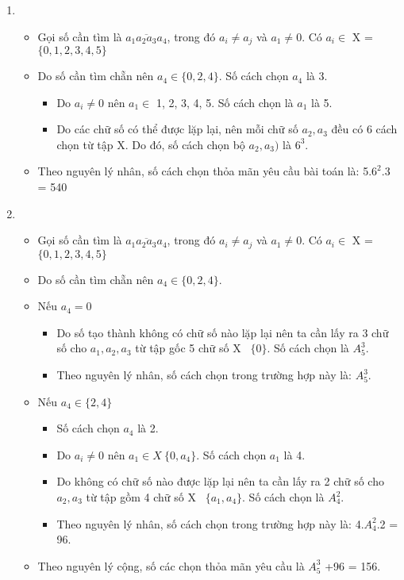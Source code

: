 \documentclass[12pt,oneside]{book}
\begin{document}
\begin{enumerate}[label = \alph*)]
\begin{itemize}
\end{itemize}
\item 
\begin{itemize}
	\item Gọi số cần tìm là $\overline{a_1a_2a_3a_4}$, trong đó $a_i \ne a_j$ và $a_1 \ne 0$. Có  $a_i \in$ X = $\{0, 1, 2, 3, 4, 5\}$
	\item Do số cần tìm chẵn nên $a_4\in \{0,2,4\}$. Số cách chọn $a_4$ là 3.
	\begin{itemize}
		\item Do $a_i \ne 0$ nên $a_1 \in $ {1, 2, 3, 4, 5}. Số cách chọn là $a_1$ là 5.
		\item Do các chữ số có thể được lặp lại, nên mỗi chữ số $a_2,a_3$ đều có 6 cách chọn từ tập X. Do đó, số cách chọn bộ $a_2,a_3)$ là $6^3$.
	\end{itemize}
	\item Theo nguyên lý nhân, số cách chọn thỏa mãn yêu cầu bài toán là: 5.$6^2$.3 = 540
\end{itemize}
\item 
\begin{itemize}
	\item Gọi số cần tìm là $\overline{a_1a_2a_3a_4}$, trong đó $a_i \ne a_j$ và $a_1 \ne 0$. Có  $a_i \in$ X = $\{0, 1, 2, 3, 4, 5\}$
	\item Do số cần tìm chẵn nên $a_4 \in \{0,2,4\}$.
	\item Nếu $a_4 = 0$
	\begin{itemize}
		\item Do số tạo thành không có chữ số nào lặp lại nên ta cần lấy ra 3 chữ số cho $a_1,a_2,a_3$ từ tập gốc 5 chữ số X \ $\{0\}$. Số cách chọn là $A_5^3$.
		\item Theo nguyên lý nhân, số cách chọn trong trường hợp này là: $A_5^3$.
	\end{itemize}
	\item Nếu $a_4 \in \{2,4\}$
	\begin{itemize}
		\item Số cách chọn $a_4$ là 2.
		\item Do $a_i \ne 0$ nên $a_1 \in X \ \{0,a_4\}$. Số cách chọn $a_1$ là 4.
		\item Do không có chữ số nào được lặp lại nên ta cần lấy ra 2 chữ số cho $a_2, a_3$ từ tập gồm 4 chữ số X \ $\{a_1, a_4\}$. Số cách chọn là $A_4^2$.
		\item Theo nguyên lý nhân, số cách chọn trong trường hợp này là: 4.$A_4^2$.2 = 96.
	\end{itemize}
	\item Theo nguyên lý cộng, số các chọn thỏa mãn yêu cầu là $A_5^3$ +96 = 156.
\end{itemize}
\end{enumerate}
\end{document}
